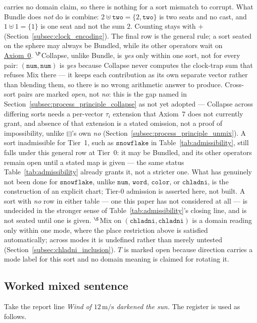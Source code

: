\documentclass[12pt, a4paper]{article}
\begin{document}
\begin{table}[h]
{carries no domain claim, so there is nothing for a sort mismatch to
corrupt. What Bundle does \emph{not} do is combine: $2\uplus
\texttt{two}=\{2,\texttt{two}\}$ is two seats and no cast, and
$1\uplus 1=\{1\}$ is one seat and not the sum $2$. Counting stays with
$+$ (Section~\ref{subsec:clock_encoding}). The final row is the
general rule; a sort seated on the sphere may always be Bundled, while
its other operators wait on
\hyperref[subsec:axiom0_admissibility]{Axiom~0}.
$^{\P}$Collapse, unlike Bundle, is \emph{yes} only within one sort,
not for every pair: $(\mathtt{num},\mathtt{num})$ is \emph{yes}
because Collapse never computes the clock-trap sum that refuses Mix
there --- it keeps each contribution as its own separate vector
rather than blending them, so there is no wrong arithmetic answer to
produce. Cross-sort pairs are marked \emph{open}, not \emph{no}: this
is the gap named in
Section~\ref{subsec:process_principle_collapse} as not yet
adopted --- Collapse across differing sorts needs a per-vector
$\tau_i$ extension that Axiom~7 does not currently grant, and absence
of that extension is a stated omission, not a proof of
impossibility, unlike $\boxminus$'s own \emph{no}
(Section~\ref{subsec:process_principle_unmix}). A sort inadmissible for
Tier~1, such as $\mathtt{snowflake}$ in
Table~\ref{tab:admissibility}, still falls under this general row at
Tier~0: it may be Bundled, and its other operators remain open until
a stated map is given --- the same status Table~\ref{tab:admissibility}
already grants it, not a stricter one. What has genuinely not been
done for $\mathtt{snowflake}$, unlike $\mathtt{num}$, $\mathtt{word}$,
$\mathtt{color}$, or $\mathtt{chladni}$, is the construction of an
explicit chart; Tier-0 admission is asserted here, not built. A sort
with \emph{no} row in either table --- one this paper has not
considered at all --- is undecided in the stronger sense of
Table~\ref{tab:admissibility}'s closing line, and is not seated until
one is given.
$^{\S}$Mix on $(\mathtt{chladni},\mathtt{chladni})$ is a domain
reading only within one mode, where the place restriction above is
satisfied automatically; across modes it is undefined rather than
merely untested (Section~\ref{subsec:chladni_inclusion}). $T$ is
marked open because direction carries a mode label for this sort and
no domain meaning is claimed for rotating it.}
\label{tab:type_table}
\end{table}

\subsection{Worked mixed sentence}
\label{subsec:mixed_sentence}
Take the report line \emph{Wind of $12\,\mathrm{m/s}$ darkened the sun.}
The register is used as follows.
\end{document}

